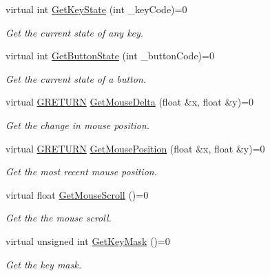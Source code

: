 \begin{DoxyCompactItemize}
\item 
virtual int \hyperlink{class_g_w_1_1_c_o_r_e_1_1_g_input_a58bd9b0ff864391f6455955802292513}{Get\+Key\+State} (int \+\_\+key\+Code)=0
\begin{DoxyCompactList}\small\item\em Get the current state of any key. \end{DoxyCompactList}\item 
virtual int \hyperlink{class_g_w_1_1_c_o_r_e_1_1_g_input_a22770ecd4e65ac105f362da351a953e9}{Get\+Button\+State} (int \+\_\+button\+Code)=0
\begin{DoxyCompactList}\small\item\em Get the current state of a button. \end{DoxyCompactList}\item 
virtual \hyperlink{namespace_g_w_a69b1aaebac1cac8049825f035884c95b}{G\+R\+E\+T\+U\+RN} \hyperlink{class_g_w_1_1_c_o_r_e_1_1_g_input_a570f179fb0fc093d3f6422f9c170efeb}{Get\+Mouse\+Delta} (float \&x, float \&y)=0
\begin{DoxyCompactList}\small\item\em Get the change in mouse position. \end{DoxyCompactList}\item 
virtual \hyperlink{namespace_g_w_a69b1aaebac1cac8049825f035884c95b}{G\+R\+E\+T\+U\+RN} \hyperlink{class_g_w_1_1_c_o_r_e_1_1_g_input_aa62945d29410ef2afad6ed39e0ff6575}{Get\+Mouse\+Position} (float \&x, float \&y)=0
\begin{DoxyCompactList}\small\item\em Get the most recent mouse position. \end{DoxyCompactList}\item 
virtual float \hyperlink{class_g_w_1_1_c_o_r_e_1_1_g_input_a84238bcdd0cc1af02c727535c4da3623}{Get\+Mouse\+Scroll} ()=0
\begin{DoxyCompactList}\small\item\em Get the the mouse scroll. \end{DoxyCompactList}\item 
virtual unsigned int \hyperlink{class_g_w_1_1_c_o_r_e_1_1_g_input_ab634a00fa9e5a12142bf6d50c112a0b3}{Get\+Key\+Mask} ()=0
\begin{DoxyCompactList}\small\item\em Get the key mask. \end{DoxyCompactList}\item 
\hypertarget{class_g_w_1_1_c_o_r_e_1_1_g_interface_a80f212dcdf60202cf9da49405863d1d5}{}\label{class_g_w_1_1_c_o_r_e_1_1_g_interface_a80f212dcdf60202cf9da49405863d1d5} 

\end{DoxyCompactItemize}
